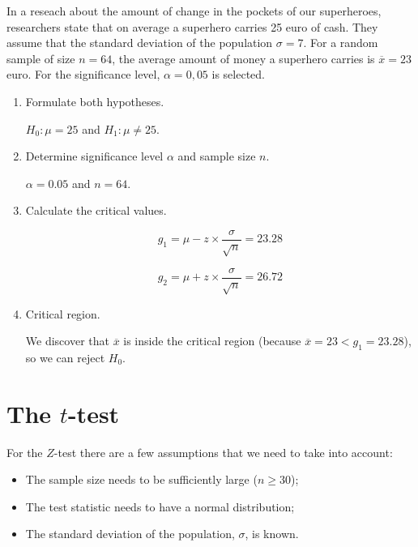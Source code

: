 \begin{example}
  In a reseach about the amount of change in the pockets of our superheroes, researchers state that on average a superhero carries 25 euro of cash.
  They assume that the standard deviation of the population $\sigma = 7$.
  For a random sample of size $n=64$, the average amount of money a superhero carries is $\overline{x} = 23$ euro. 
  For the significance level, $\alpha = 0,05$ is selected.
  
  \begin{enumerate}
    \item Formulate both hypotheses.
    
    $H_{0} : \mu = 25$ and $H_{1}: \mu \neq 25$.
    
    \item Determine significance level $\alpha$ and sample size $n$.
    
    $\alpha = 0.05$ and $n=64$.
    
    \item Calculate the critical values.
    
    \[ g_{1} = \mu - z \times \frac{\sigma}{\sqrt{n}} = 23.28 \]
    
    \[ g_{2} = \mu + z \times \frac{\sigma}{\sqrt{n}} = 26.72 \]
    
    \item Critical region.
    
    We discover that $\overline{x}$ is inside the critical region (because $\overline{x} = 23 < g_1 = 23.28$), so we can reject $H_{0}$.
    
  \end{enumerate}
\end{example}

\section{The \texorpdfstring{$t$}{t}-test}
\label{sec:t-test}

For the $Z$-test there are a few assumptions that we need to take into account:

\begin{itemize}
  \item The sample size needs to be sufficiently large ($n \ge 30$);
  \item The test statistic needs to have a normal distribution;
  \item The standard deviation of the population, $\sigma$, is known.
\end{itemize}
 
